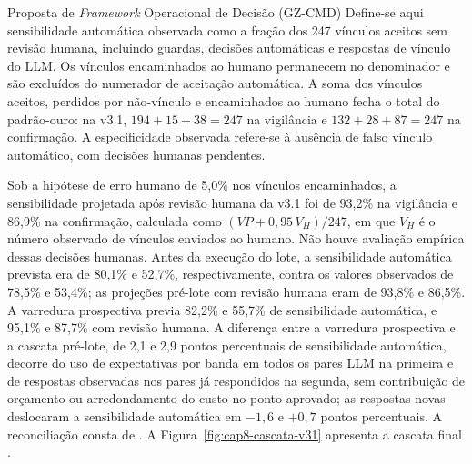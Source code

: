 \begin{chapter}{Proposta de \textit{Framework} Operacional de Decisão (GZ-CMD)}
Define-se aqui sensibilidade automática observada como a fração dos 247 vínculos aceitos sem revisão humana, incluindo guardas, decisões automáticas e respostas de vínculo do LLM. Os vínculos encaminhados ao humano permanecem no denominador e são excluídos do numerador de aceitação automática. A soma dos vínculos aceitos, perdidos por não-vínculo e encaminhados ao humano fecha o total do padrão-ouro: na v3.1, $194+15+38=247$ na vigilância e $132+28+87=247$ na confirmação. A especificidade observada refere-se à ausência de falso vínculo automático, com decisões humanas pendentes.

Sob a hipótese de erro humano de 5,0\% nos vínculos encaminhados, a sensibilidade projetada após revisão humana da v3.1 foi de 93,2\% na vigilância e 86,9\% na confirmação, calculada como $(VP+0{,}95\,V_H)/247$, em que $V_H$ é o número observado de vínculos enviados ao humano. Não houve avaliação empírica dessas decisões humanas. Antes da execução do lote, a sensibilidade automática prevista era de 80,1\% e 52,7\%, respectivamente, contra os valores observados de 78,5\% e 53,4\%; as projeções pré-lote com revisão humana eram de 93,8\% e 86,5\%. A varredura prospectiva previa 82,2\% e 55,7\% de sensibilidade automática, e 95,1\% e 87,7\% com revisão humana. A diferença entre a varredura prospectiva e a cascata pré-lote, de 2,1 e 2,9 pontos percentuais de sensibilidade automática, decorre do uso de expectativas por banda em todos os pares LLM na primeira e de respostas observadas nos pares já respondidos na segunda, sem contribuição de orçamento ou arredondamento do custo no ponto aprovado; as respostas novas deslocaram a sensibilidade automática em $-1{,}6$ e $+0{,}7$ pontos percentuais. A reconciliação consta de . A Figura~\ref{fig:cap8-cascata-v31} apresenta a cascata final \cite{Jardim2026phdrepo}.


\end{chapter}
